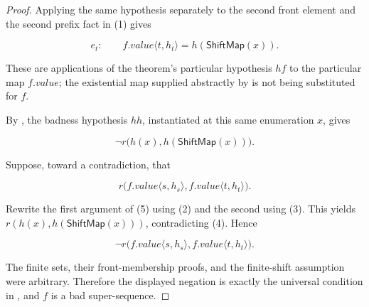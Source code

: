 \begin{proof}
Applying the same hypothesis separately to the second front element and
the second prefix fact in (1) gives

\[
 e_t:\qquad
 f.value\langle t,h_t\rangle=h(\mathsf{ShiftMap}(x)).
 \tag{3}
\]

These are applications of the theorem's particular hypothesis $hf$ to the
particular map $f.value$; the existential map supplied abstractly by
 is not being substituted for $f$.

By , the badness hypothesis $hh$, instantiated
at this same enumeration $x$, gives

\[
 \neg r\bigl(h(x),h(\mathsf{ShiftMap}(x))\bigr).
 \tag{4}
\]

Suppose, toward a contradiction, that

\[
 r\bigl(f.value\langle s,h_s\rangle,
        f.value\langle t,h_t\rangle\bigr).
 \tag{5}
\]

Rewrite the first argument of (5) using (2) and the second using (3).
This yields $r(h(x),h(\mathsf{ShiftMap}(x)))$, contradicting (4).  Hence

\[
 \neg r\bigl(f.value\langle s,h_s\rangle,
             f.value\langle t,h_t\rangle\bigr).
\]

The finite sets, their front-membership proofs, and the finite-shift
assumption were arbitrary.  Therefore the displayed negation is exactly
the universal condition in , and $f$ is a bad
super-sequence.
\end{proof}
